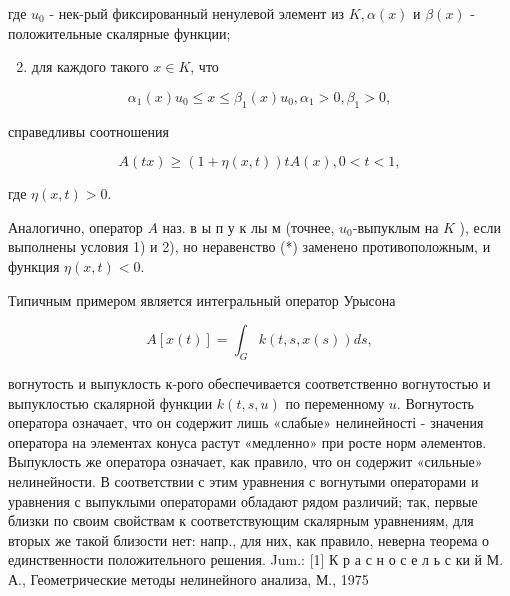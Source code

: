 \documentclass[10pt]{article}
\begin{document}
где $u_{0}$ - нек-рый фиксированный ненулевой элемент из $K, \alpha(x)$ и $\beta(x)$ - положительные скалярные функции;



\begin{enumerate}

  \setcounter{enumi}{1}

  \item для каждого такого $x \in K$, что

\end{enumerate}



\[

\alpha_{1}(x) u_{0} \leqslant x \leqslant \beta_{1}(x) u_{0}, \alpha_{1}>0, \beta_{1}>0,

\]



справедливы соотношения



\[

A(t x) \geqslant(1+\eta(x, t)) t A(x), 0<t<1,

\]



где $\eta(x, t)>0$.



Аналогично, оператор $A$ наз. в ы п у к лы м (точнее, $u_{0}$-выпуклым на $K$ ), если выполнены условия 1) и 2), но неравенство (*) заменено противоположным, и функция $\eta(x, t)<0$.



Типичным примером является интегральный оператор Урысона



\[

A[x(t)]=\int_{G} k(t, s, x(s)) d s,

\]



вогнутость и выпуклость к-рого обеспечивается соответственно вогнутостью и выпуклостью скалярной функции $k(t, s, u)$ по переменному $u$. Вогнутость оператора означает, что он содержит лишь «слабые» нелинейності - значения оператора на элементах конуса растут «медленно» при росте норм әлементов. Выпуклость же оператора означает, как правило, что он содержит «сильные» нелинейности. В соответствии с этим уравнения с вогнутыми операторами и уравнения с выпуклыми операторами обладают рядом различий; так, первые близки по своим свойствам к соответствующим скалярным уравнениям, для вторых же такой близости нет: напр., для них, как правило, неверна теорема о единственности положительного решения. Jum.: [1] К р а с н о с е л ь с ки й М. А., Геометрические методы нелинейного анализа, М., 1975
\end{document}
